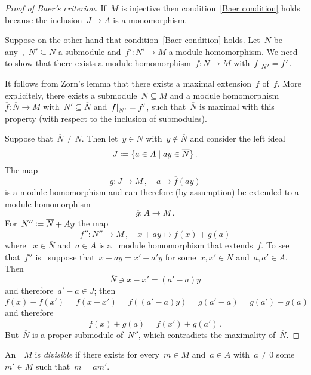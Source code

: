 \begin{proof}[Proof of Baer’s criterion]
  If~$M$ is injective then condition~\ref*{Baer condition} holds because the inclusion~$J \to A$ is a monomorphism.
  
  Suppose on the other hand that condition~\ref*{Baer condition} holds.
  Let~$N$ be any~{},~$N' \subseteq N$ a submodule and~$f' \colon N' \to M$ a module homomorphism.
  We need to show that there exists a module homomorphism~$f \colon N \to M$ with~$\restrict{f}{N'} = f'$.
  
  It follows from Zorn’s lemma that there exists a maximal extension~$\overline{f}$ of~$f$.
  More explicitely, there exists a submodule~$\overline{N} \subseteq M$ and a module homomorphism~$\overline{f} \colon \overline{N} \to M$ with~$N' \subseteq \overline{N}$ and~$\restrict{\overline{f}}{N'} = f'$, such that~$\overline{N}$ is maximal with this property (with respect to the inclusion of submodules).
  
  Suppose that~$\overline{N} \neq N$.
  Then let~$y \in N$ with~$y \notin \overline{N}$ and consider the left ideal
  \[
    J
    \defined
    \{
      a \in A
    \suchthat
      a y \in \overline{N}
    \}  \,.
  \]
  The map
  \[
    g
    \colon
    J
    \to
    M \,,
    \quad
    a
    \mapsto
    \overline{f}(a y)
  \]
  is a module homomorphism and can therefore (by assumption) be extended to a module homomorphism
  \[
    \overline{g}
    \colon
    A
    \to
    M \,.
  \]
  For~$N'' \coloneqq \overline{N} + A y$ the map
  \[
    f''
    \colon
    N''
    \to
    M \,,
    \quad
    x + a y
    \mapsto
    \overline{f}(x) + \overline{g}(a)
  \]
  where ~$x \in \overline{N}$ and~$a \in A$ is a~{\welldef} module homomorphism that extends~$f$.
  To see that~$f''$ is~{\welldef} suppose that~$x + ay = x' + a'y$ for some~$x, x' \in \overline{N}$ and~$a, a' \in A$.
  Then
  \[
    \overline{N}
    \ni
    x - x'
    =
    (a' - a)y
  \]
  and therefore~$a' - a \in J$;
  then
  \[
      \overline{f}(x) - \overline{f}(x')
    =
    \overline{f}(x - x')
    =
    \overline{f}( (a' - a) y )
    =
    \overline{g}(a' - a)
    =
    \overline{g}(a') - \overline{g}(a)
  \]
  and therefore
  \[
    \overline{f}(x) + \overline{g}(a)
    =
    \overline{f}(x') + \overline{g}(a') \,.
  \]
  But~$\overline{N}$ is a proper submodule of~$N''$, which contradicts the maximality of~$\overline{N}$.
\end{proof}


\begin{definition*}
  An~{}~$M$ is \emph{divisible} if there exists for every~$m \in M$ and~$a \in A$ with~$a \neq 0$ some~$m' \in M$ such that~$m = a m'$.
\end{definition*}


